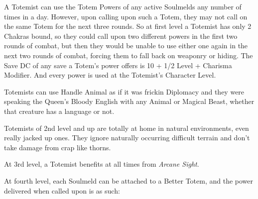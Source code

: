  A Totemist can use the Totem Powers of any active Soulmelds any number of times in a day. However, upon calling upon such a Totem, they may not call on the same Totem for the next three rounds. So at first level a Totemist has only 2 Chakras bound, so they could call upon two different powers in the first two rounds of combat, but then they would be unable to use either one again in the next two rounds of combat, forcing them to fall back on weaponry or hiding. The Save DC of any save a Totem's power offers is 10 + 1/2 Level + Charisma Modifier. And every power is used at the Totemist's Character Level.

 Totemists can use Handle Animal as if it was frickin Diplomacy and they were speaking the Queen's Bloody English with any Animal or Magical Beast, whether that creature has a language or not.


 Totemists of 2nd level and up are totally at home in natural environments, even really jacked up ones. They ignore naturally occurring difficult terrain and don't take damage from crap like thorns.

 At 3rd level, a Totemist benefits at all times from \emph{Arcane Sight}.

 At fourth level, each Soulmeld can be attached to a Better Totem, and the power delivered when called upon is as such:

